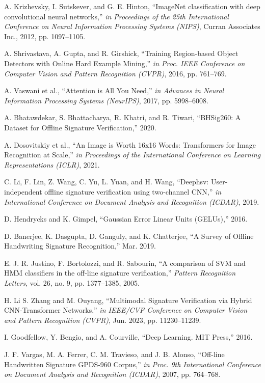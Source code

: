 \begin{thebibliography}{10}

A. Krizhevsky, I. Sutskever, and G. E. Hinton, ``ImageNet classification with deep convolutional neural networks,'' {\em in Proceedings of the 25th International Conference on Neural Information Processing Systems (NIPS)}, Curran Associates Inc.,
2012, pp. 1097--1105.

A. Shrivastava, A. Gupta, and R. Girshick, ``Training Region-based Object Detectors with Online Hard Example Mining,'' {\em in Proc. IEEE Conference on Computer Vision and Pattern Recognition (CVPR)},
2016, pp. 761--769.

A. Vaswani et al., ``Attention is All You Need,'' {\em in Advances in Neural Information Processing Systems (NeurIPS)},
2017, pp. 5998--6008.

A. Bhatawdekar, S. Bhattacharya, R. Khatri, and R. Tiwari, ``BHSig260: A Dataset for Offline Signature Verification,''
2020.

A. Dosovitskiy et al., ``An Image is Worth 16x16 Words: Transformers for Image Recognition at Scale,'' {\em in Proceedings of the International Conference on Learning Representations (ICLR)},
2021.

C. Li, F. Lin, Z. Wang, C. Yu, L. Yuan, and H. Wang, ``Deephsv: User-independent offline signature verification using two-channel CNN,'' {\em in International Conference on Document Analysis and Recognition (ICDAR)},
2019.

D. Hendrycks and K. Gimpel, ``Gaussian Error Linear Units (GELUs),''
2016.

D. Banerjee, K. Dasgupta, D. Ganguly, and K. Chatterjee, ``A Survey of Offline Handwriting Signature Recognition,''
Mar. 2019.

E. J. R. Justino, F. Bortolozzi, and R. Sabourin, ``A comparison of SVM and HMM classifiers in the off-line signature verification,'' {\em Pattern Recognition Letters}, vol. 26, no. 9, pp. 1377--1385,
2005.

H. Li S. Zhang and M. Ouyang, ``Multimodal Signature Verification via Hybrid CNN-Transformer Networks,'' {\em in IEEE/CVF Conference on Computer Vision and Pattern Recognition (CVPR)},
Jun. 2023, pp. 11230--11239.

I. Goodfellow, Y. Bengio, and A. Courville, ``Deep Learning. MIT Press,''
2016.

J. F. Vargas, M. A. Ferrer, C. M. Travieso, and J. B. Alonso, ``Off-line Handwritten Signature GPDS-960 Corpus,'' {\em in Proc. 9th International Conference on Document Analysis and Recognition (ICDAR)},
2007, pp. 764--768.


\end{thebibliography}
